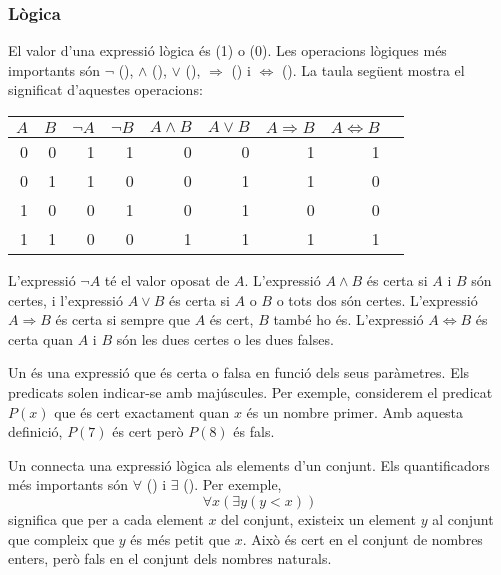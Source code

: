 \subsubsection{Lògica}


El valor d'una expressió lògica és
 (1) o  (0).
Les operacions lògiques més importants són
$\lnot$ (),
$\land$ (),
$\lor$ (),
$\Rightarrow$ () i
$\Leftrightarrow$ ().
La taula següent mostra el significat d'aquestes operacions:

\begin{centre}
\begin{tabular}{rr|rrrrrrr}
$A$ & $B$ & $\lnot A$ & $\lnot B$ & $A \land B$ & $A \lor B$ & $A \Rightarrow B$ & $A \Leftrightarrow B$ \\
\hline
0 & 0 & 1 & 1 & 0 & 0 & 1 & 1 \\
0 & 1 & 1 & 0 & 0 & 1 & 1 & 0 \\
1 & 0 & 0 & 1 & 0 & 1 & 0 & 0 \\
1 & 1 & 0 & 0 & 1 & 1 & 1 & 1 \\
\end{tabular}
\end{centre}

L'expressió $\lnot A$ té el valor oposat de $A$.
L'expressió $A \land B$ és certa si $A$ i $B$
són certes,
i l'expressió $A \lor B$ és certa si $A$ o $B$ o tots dos
són certes.
L'expressió $A \Rightarrow B$ és certa
si sempre que $A$ és cert, $B$ també ho és.
L'expressió $A \Leftrightarrow B$ és certa
quan $A$ i $B$ són les dues certes o les dues falses.


Un  és una expressió que és certa o falsa
en funció dels seus paràmetres.
Els predicats solen indicar-se amb majúscules.
Per exemple, considerem el predicat $P(x)$
que és cert exactament quan $x$ és un nombre primer.
Amb aquesta definició, $P(7)$ és cert però $P(8)$ és fals.


Un  connecta una expressió lògica
als elements d'un conjunt.
Els quantificadors més importants són
$\forall$ () i $\exists$ ().
Per exemple,
\[\forall x (\exists y (y <x))\]
significa que per a cada element $x$ del conjunt,
existeix un element $y$ al conjunt
que compleix que $y$ és més petit que $x$.
Això és cert en el conjunt de nombres enters,
però fals en el conjunt dels nombres naturals.

